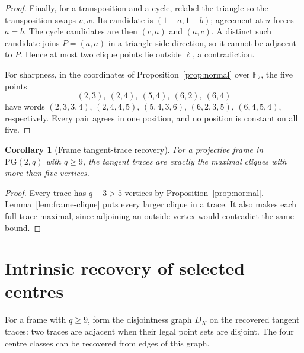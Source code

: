 \documentclass[11pt]{article}
\newtheorem{corollary}[theorem]{Corollary}
\theoremstyle{definition}
\theoremstyle{remark}
\newcommand{\F}{\mathbb F}
\newcommand{\PG}{\mathrm{PG}}
\begin{document}
\begin{proof}
Finally, for a transposition and a cycle, relabel the triangle so the
transposition swaps $v,w$. Its candidate is $(1-a,1-b)$; agreement at
$u$ forces $a=b$. The cycle candidates are then $(c,a)$ and $(a,c)$.
A distinct such candidate joins $P=(a,a)$ in a triangle-side direction,
so it cannot be adjacent to $P$. Hence at most two clique points lie
outside $\ell$, a contradiction.

For sharpness, in the coordinates of Proposition~\ref{prop:normal} over
$\F_7$, the five points
\[
 (2,3),\ (2,4),\ (5,4),\ (6,2),\ (6,4)
\]
have words $(2,3,3,4)$, $(2,4,4,5)$, $(5,4,3,6)$,
$(6,2,3,5)$, $(6,4,5,4)$, respectively. Every pair agrees in one position,
and no position is constant on all five.
\end{proof}

\begin{corollary}[Frame tangent-trace recovery]\label{cor:frame-traces}
For a projective frame in $\PG(2,q)$ with $q\ge9$, the tangent traces
are exactly the maximal cliques with more than five vertices.
\end{corollary}
\begin{proof}
Every trace has $q-3>5$ vertices by Proposition~\ref{prop:normal}.
Lemma~\ref{lem:frame-clique} puts every larger clique in a trace.
It also makes each full trace maximal, since adjoining an outside vertex
would contradict the same bound.
\end{proof}

\section{Intrinsic recovery of selected centres}
\label{sec:centres}

For a frame with $q\ge9$, form the disjointness graph $D_K$ on the
recovered tangent traces: two traces are adjacent when their legal point
sets are disjoint. The four centre classes can be recovered from edges
of this graph.
\end{document}

